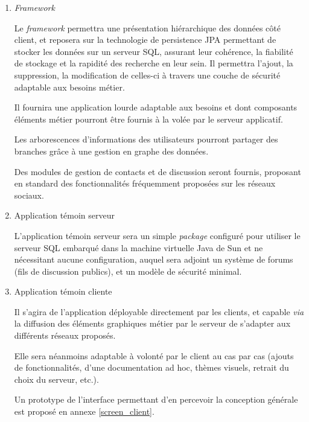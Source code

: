 \begin{enumerate}

 \item \textit{Framework}

Le \textit{framework} permettra une présentation hiérarchique des données côté client, et reposera sur la technologie de persistence JPA permettant de stocker les données sur un serveur SQL, assurant leur cohérence, la fiabilité de stockage et la rapidité des recherche en leur sein.
Il permettra l'ajout, la suppression, la modification de celles-ci à travers une couche de sécurité adaptable aux besoins métier.

Il fournira une application lourde adaptable aux besoins et dont composants éléments métier pourront être fournis à la volée par le serveur applicatif.

Les arborescences d'informations des utilisateurs pourront partager des branches grâce à une gestion en graphe des données.

Des modules de gestion de contacts et de discussion seront fournis, proposant en standard des fonctionnalités fréquemment proposées sur les réseaux sociaux.

 \item Application témoin serveur

L'application témoin serveur sera un simple \emph{package} configuré pour utiliser le serveur SQL embarqué dans la machine virtuelle Java de Sun et ne nécessitant aucune configuration, auquel sera adjoint un système de forums (fils de discussion publics), et un modèle de sécurité minimal.

 \item Application témoin cliente

Il s'agira de l'application déployable directement par les clients, et capable \emph{via} la diffusion des éléments graphiques métier par le serveur de s'adapter aux différents réseaux proposés.

Elle sera néanmoins adaptable à volonté par le client au cas par cas (ajouts de fonctionnalités, d'une documentation ad hoc, thèmes visuels, retrait du choix du serveur, etc.).

Un prototype de l'interface permettant d'en percevoir la conception générale est proposé en annexe \ref{screen_client}.

\end{enumerate}